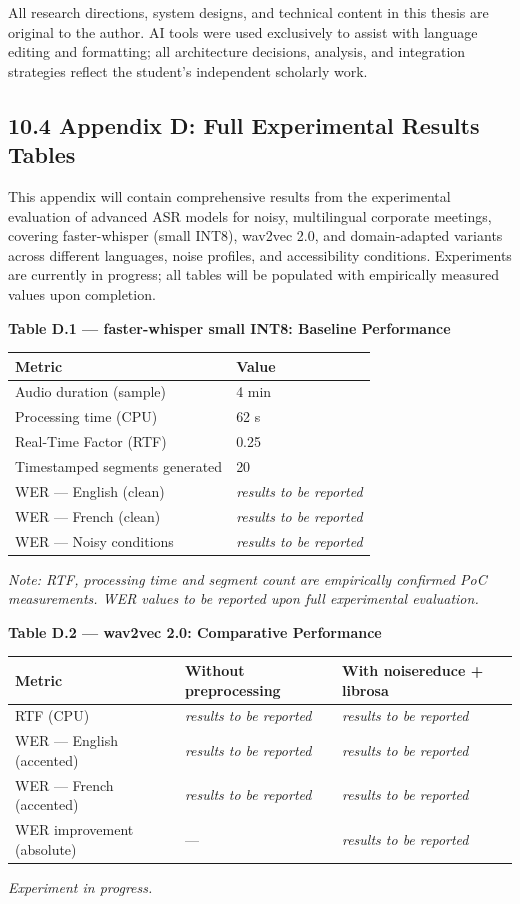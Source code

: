 \documentclass[12pt,a4paper]{article}
\begin{document}
All research directions, system designs, and technical content in this thesis are original to the author. AI tools were used exclusively to assist with language editing and formatting; all architecture decisions, analysis, and integration strategies reflect the student’s independent scholarly work.


\subsection{10.4 Appendix D: Full Experimental Results Tables}


This appendix will contain comprehensive results from the experimental evaluation of advanced ASR models for noisy, multilingual corporate meetings, covering faster-whisper (small INT8), wav2vec 2.0, and domain-adapted variants across different languages, noise profiles, and accessibility conditions. Experiments are currently in progress; all tables will be populated with empirically measured values upon completion.

\bigskip
\noindent\textbf{Table D.1 --- faster-whisper small INT8: Baseline Performance}

\begin{center}
\begin{tabular}{|l|l|}
\hline
\textbf{Metric} & \textbf{Value} \\
\hline
Audio duration (sample) & 4 min \\
Processing time (CPU) & 62 s \\
Real-Time Factor (RTF) & 0.25 \\
Timestamped segments generated & 20 \\
WER --- English (clean) & \textit{results to be reported} \\
WER --- French (clean) & \textit{results to be reported} \\
WER --- Noisy conditions & \textit{results to be reported} \\
\hline
\end{tabular}
\end{center}
\textit{Note: RTF, processing time and segment count are empirically confirmed PoC measurements. WER values to be reported upon full experimental evaluation.}

\bigskip
\noindent\textbf{Table D.2 --- wav2vec 2.0: Comparative Performance}

\begin{center}
\begin{tabular}{|l|l|l|}
\hline
\textbf{Metric} & \textbf{Without preprocessing} & \textbf{With noisereduce + librosa} \\
\hline
RTF (CPU) & \textit{results to be reported} & \textit{results to be reported} \\
WER --- English (accented) & \textit{results to be reported} & \textit{results to be reported} \\
WER --- French (accented) & \textit{results to be reported} & \textit{results to be reported} \\
WER improvement (absolute) & --- & \textit{results to be reported} \\
\hline
\end{tabular}
\end{center}
\textit{Experiment in progress.}
\end{document}
